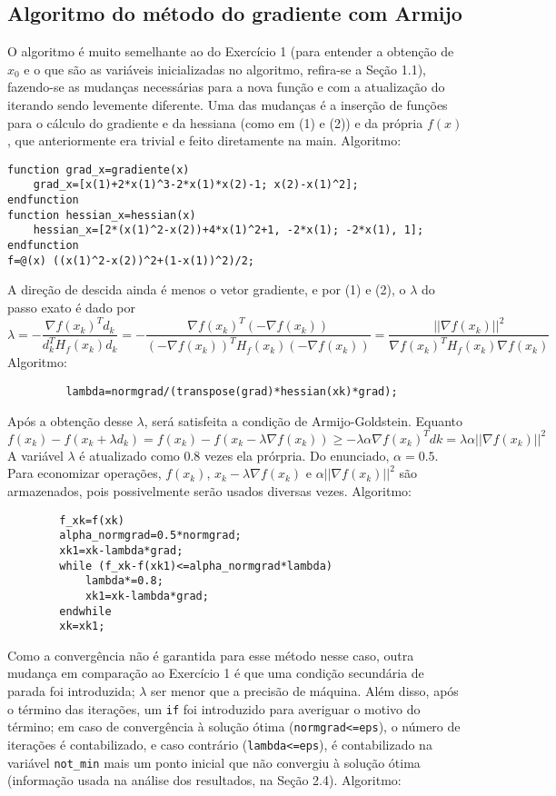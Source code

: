 \documentclass[a4paper, 12pt]{article}
\begin{document}
\subsection{Algoritmo do método do gradiente com Armijo}
O algoritmo é muito semelhante ao do Exercício 1 (para entender a obtenção de $x_0$ e o que são as variáveis inicializadas no algoritmo, refira-se a Seção 1.1), fazendo-se as mudanças necessárias para a nova função e com a atualização do iterando sendo levemente diferente.
Uma das mudanças é a inserção de funções para o cálculo do gradiente e da hessiana (como em (1) e (2)) e da própria $f(x)$, que anteriormente era trivial e feito diretamente na main. Algoritmo:
\begin{lstlisting}
function grad_x=gradiente(x)
    grad_x=[x(1)+2*x(1)^3-2*x(1)*x(2)-1; x(2)-x(1)^2];
endfunction
function hessian_x=hessian(x)
    hessian_x=[2*(x(1)^2-x(2))+4*x(1)^2+1, -2*x(1); -2*x(1), 1];
endfunction
f=@(x) ((x(1)^2-x(2))^2+(1-x(1))^2)/2;
\end{lstlisting}
A direção de descida ainda é menos o vetor gradiente, e por (1) e (2), o $\lambda$ do passo exato é dado por
\[
\lambda=-\frac{\nabla f(x_k)^Td_k}{d_k^TH_f(x_k)d_k}=-\frac{\nabla f(x_k)^T(-\nabla f(x_k))}{(-\nabla f(x_k))^TH_f(x_k)(-\nabla f(x_k))}=\frac{||\nabla f(x_k)||^2}{\nabla f(x_k)^TH_f(x_k)\nabla f(x_k)}
\]
Algoritmo:
\begin{lstlisting}
         lambda=normgrad/(transpose(grad)*hessian(xk)*grad);
\end{lstlisting}
Após a obtenção desse $\lambda$, será satisfeita a condição de Armijo-Goldstein. Equanto 
\[
f(x_k)-f(x_k+\lambda d_k)=f(x_k)-f(x_k-\lambda \nabla f(x_k))\geq -\lambda\alpha\nabla f(x_k)^Tdk=\lambda\alpha||\nabla f(x_k)||^2
\]
A variável $\lambda$ é atualizado como 0.8 vezes ela prórpria. Do enunciado, $\alpha=0.5$. Para economizar operações, $f(x_k)$, $x_k-\lambda\nabla f(x_k)$ e $\alpha||\nabla f(x_k)||^2$ são armazenados, pois possivelmente serão usados diversas vezes. Algoritmo:
\begin{lstlisting}
        f_xk=f(xk)
        alpha_normgrad=0.5*normgrad;
        xk1=xk-lambda*grad;
        while (f_xk-f(xk1)<=alpha_normgrad*lambda)
            lambda*=0.8;
            xk1=xk-lambda*grad;
        endwhile
        xk=xk1;                 
\end{lstlisting}
Como a convergência não é garantida para esse método nesse caso, outra mudança em comparação ao Exercício 1 é que uma condição secundária de parada foi introduzida; $\lambda$ ser menor que a precisão de máquina. Além disso, após o término das iterações, um \verb+if+ foi introduzido para averiguar o motivo do término; em caso de convergência à solução ótima (\verb+normgrad<=eps+), o número de iterações é contabilizado, e caso contrário (\verb+lambda<=eps+), é contabilizado na variável \verb+not_min+ mais um ponto inicial que não convergiu à solução ótima (informação usada na análise dos resultados, na Seção 2.4). Algoritmo:
\end{document}
